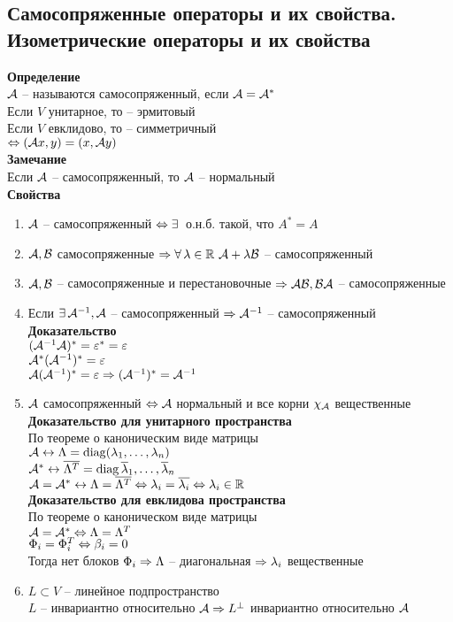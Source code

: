 \documentclass[12pt]{article}
\begin{document}
\subsection{Самосопряженные операторы и их свойства. Изометрические операторы и их свойства}
\textbf{Определение}\\
$\mathcal{A}$ -- называются самосопряженный, если $\mathcal{A} = \mathcal{A}^*$\\
Если $V$ унитарное, то -- эрмитовый\\
Если $V$ евклидово, то -- симметричный\\
$\Leftrightarrow (\mathcal{A} x, y) = (x, \mathcal{A} y)$\\
\textbf{Замечание}\\
Если $\mathcal{A}$ -- самосопряженный, то $\mathcal{A}$ -- нормальный\\
\textbf{Свойства}
\begin{enumerate}
    \item $\mathcal{A}$ -- самосопряженный $\Leftrightarrow \exists\,$ о.н.б. такой, что $A^* = A$
    \item $\mathcal{A}, \mathcal{B}$ самосопряженные $\Rightarrow \forall\, \lambda \in \mathbb{R}\ \mathcal{A} + \lambda\mathcal{B}$ -- самосопряженный
    \item $\mathcal{A}, \mathcal{B}$ -- самосопряженные и перестановочные $\Rightarrow \mathcal{A}\mathcal{B}, \mathcal{B}\mathcal{A}$ -- самосопряженные
    \item Если $\exists\, \mathcal{A}^{-1}, \mathcal{A}$ -- самосопряженный $\Rightarrow \mathcal{A}^{-1}$ -- самосопряженный\\
    \textbf{Доказательство}\\
    $(\mathcal{A}^{-1}\mathcal{A})^* = \varepsilon^* = \varepsilon$\\
    $\mathcal{A}^* (\mathcal{A}^{-1})^* = \varepsilon$\\
    $\mathcal{A}(\mathcal{A}^{-1})^* = \varepsilon \Rightarrow (\mathcal{A}^{-1})^* = \mathcal{A}^{-1}$
    \item $\mathcal{A}$ самосопряженный $\Leftrightarrow \mathcal{A}$ нормальный и все корни $\chi_\mathcal{A}$ вещественные\\
        \textbf{Доказательство для унитарного пространства}\\
        По теореме о каноническим виде матрицы\\
        $\mathcal{A} \leftrightarrow \Lambda = \operatorname{diag}( \lambda_1, \ldots, \lambda_n)$\\
        $\mathcal{A}^* \leftrightarrow \overline{ \Lambda^T} = \operatorname{diag}{\overline \lambda_1, \ldots, \overline \lambda_n}$\\
        $\mathcal{A} = \mathcal{A}^* \leftrightarrow \Lambda = \overline{ \Lambda^T} \Leftrightarrow \lambda_i = \overline{ \lambda_i} \Leftrightarrow \lambda_i \in \mathbb{R}$\\
        \textbf{Доказательство для евклидова пространства}\\
        По теореме о каноническом виде матрицы\\
        $\mathcal{A} = \mathcal{A}^* \Leftrightarrow \Lambda = \Lambda^T$\\
        $ \Phi_i = \Phi_i^T \Leftrightarrow \beta_i = 0$\\
        Тогда нет блоков $ \Phi_i \Rightarrow \Lambda$ -- диагональная $\Rightarrow \lambda_i$ вещественные
    \item $L \subset V$ -- линейное подпространство\\
        $L$ -- инвариантно относительно $\mathcal{A} \Rightarrow L^\perp$ инвариантно относительно $\mathcal{A}$
\end{enumerate}
\end{document}
